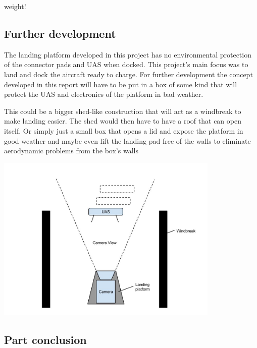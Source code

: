 weight!


\subsection{Further development}
The landing platform developed in this project has no environmental protection of the connector pads and UAS when docked. This project's main focus was to land and dock the aircraft ready to charge. For further development the concept developed in this report will have to be put in a box of some kind that will protect the UAS and electronics of the platform in bad weather.

This could be a bigger shed-like construction that will act as a windbreak to make landing easier. The shed would then have to have a roof that can open itself. Or simply just a small box that opens a lid and expose the platform in good weather and maybe even lift the landing pad free of the walls to eliminate aerodynamic problems from the box's walls

\begin{center}
	\includegraphics[width=0.8\textwidth]{imgs/landing_platform}
\end{center}

\subsection{Part conclusion}